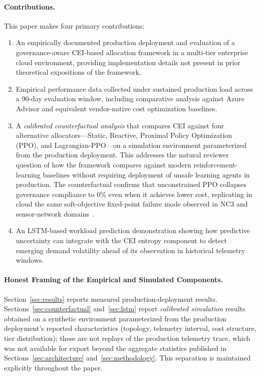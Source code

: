 \documentclass[runningheads]{llncs}
\begin{document}
\paragraph{Contributions.} This paper makes four primary contributions:
\begin{enumerate}
\item An empirically documented production deployment and evaluation of a governance-aware CEI-based allocation framework in a multi-tier enterprise cloud environment, providing implementation details not present in prior theoretical expositions of the framework.
\item Empirical performance data collected under sustained production load across a 90-day evaluation window, including comparative analysis against Azure Advisor and equivalent vendor-native cost optimization baselines.
\item A \emph{calibrated counterfactual analysis} that compares CEI against four alternative allocators---Static, Reactive, Proximal Policy Optimization (PPO), and Lagrangian-PPO---on a simulation environment parameterized from the production deployment. This addresses the natural reviewer question of how the framework compares against modern reinforcement-learning baselines without requiring deployment of unsafe learning agents in production. The counterfactual confirms that unconstrained PPO collapses governance compliance to 0\% even when it achieves lower cost, replicating in cloud the same soft-objective fixed-point failure mode observed in NC3 and sensor-network domains~\cite{paper1,paper2}.
\item An LSTM-based workload prediction demonstration showing how predictive uncertainty can integrate with the CEI entropy component to detect emerging demand volatility ahead of its observation in historical telemetry windows.
\end{enumerate}

\paragraph{Honest Framing of the Empirical and Simulated Components.} Section~\ref{sec:results} reports measured production-deployment results. Sections~\ref{sec:counterfactual} and~\ref{sec:lstm} report \emph{calibrated simulation} results obtained on a synthetic environment parameterized from the production deployment's reported characteristics (topology, telemetry interval, cost structure, tier distribution); these are not replays of the production telemetry trace, which was not available for export beyond the aggregate statistics published in Sections~\ref{sec:architecture} and~\ref{sec:methodology}. This separation is maintained explicitly throughout the paper.
\end{document}
